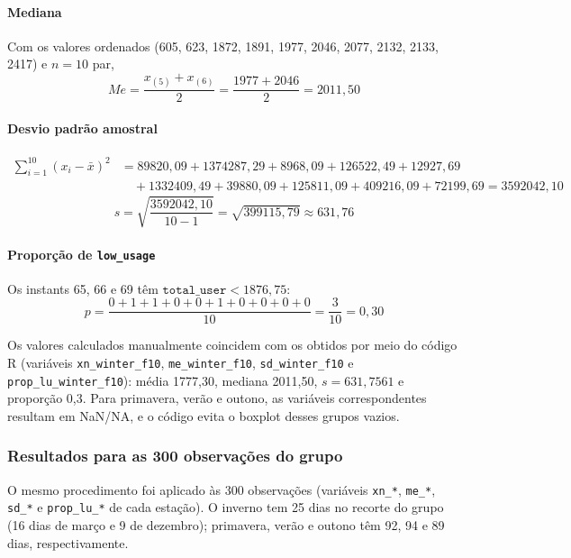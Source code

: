 \documentclass[10pt, a4paper]{article}
\begin{document}
\paragraph{Mediana} Com os valores ordenados (605, 623, 1872, 1891, 1977, 2046, 2077, 2132, 2133, 2417) e $n = 10$ par,
\[
Me = \frac{x_{(5)} + x_{(6)}}{2} = \frac{1977 + 2046}{2} = 2011{,}50
\]

\paragraph{Desvio padrão amostral}
\begin{align*}
\sum_{i=1}^{10} (x_i - \bar{x})^2 &= 89820{,}09 + 1374287{,}29 + 8968{,}09 + 126522{,}49 + 12927{,}69 \\
&\quad + 1332409{,}49 + 39880{,}09 + 125811{,}09 + 409216{,}09 + 72199{,}69 = 3592042{,}10
\end{align*}
\[
s = \sqrt{\frac{3592042{,}10}{10 - 1}} = \sqrt{399115{,}79} \approx 631{,}76
\]

\paragraph{Proporção de \texttt{low\_usage}} Os instants 65, 66 e 69 têm $\texttt{total\_user} < 1876{,}75$:
\[
p = \frac{0 + 1 + 1 + 0 + 0 + 1 + 0 + 0 + 0 + 0}{10} = \frac{3}{10} = 0{,}30
\]

Os valores calculados manualmente coincidem com os obtidos por meio do código R (variáveis \texttt{xn\_winter\_f10}, \texttt{me\_winter\_f10}, \texttt{sd\_winter\_f10} e \texttt{prop\_lu\_winter\_f10}): média 1777,30, mediana 2011,50, $s = 631{,}7561$ e proporção 0,3. Para primavera, verão e outono, as variáveis correspondentes resultam em NaN/NA, e o código evita o boxplot desses grupos vazios.

\subsubsection{Resultados para as 300 observações do grupo}

O mesmo procedimento foi aplicado às 300 observações (variáveis \texttt{xn\_*}, \texttt{me\_*}, \texttt{sd\_*} e \texttt{prop\_lu\_*} de cada estação). O inverno tem 25 dias no recorte do grupo (16 dias de março e 9 de dezembro); primavera, verão e outono têm 92, 94 e 89 dias, respectivamente.
\end{document}
